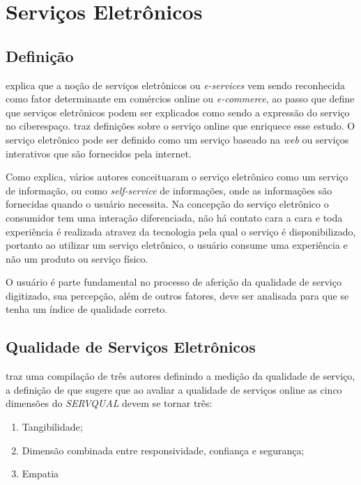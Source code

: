 \chapter[Serviços eletrônicos]{Serviços Eletrônicos}

\section{Definição}
\cite{santos2003} explica que a noção de serviços eletrônicos ou \textit{e-services} vem sendo reconhecida como fator determinante em comércios online ou \textit{e-commerce}, ao passo que \cite{rust2014} define que serviços eletrônicos podem ser explicados como sendo a expressão do serviço no ciberespaço.
\cite{rowley2006} traz definições sobre o serviço online que enriquece esse estudo. O serviço eletrônico pode ser definido como um serviço baseado na \textit{web} ou serviços interativos que são fornecidos pela internet. 

Como \cite{rowley2006} explica, vários autores conceituaram o serviço eletrônico como um serviço de informação, ou como \textit{self-service} de informações, onde as informações são fornecidas quando o usuário necessita. Na concepção do serviço eletrônico o consumidor tem uma interação diferenciada, não há contato cara a cara e toda experiência é realizada atravez da tecnologia pela qual o serviço é disponibilizado, portanto ao utilizar um serviço eletrônico, o usuário consume uma experiência e não um produto ou serviço físico. 

O usuário é parte fundamental no processo de aferição da qualidade de serviço digitizado, sua percepção, além de outros fatores, deve ser analisada para que se tenha um índice de qualidade correto.

\section{Qualidade de Serviços Eletrônicos}

\cite{buckley2003} traz uma compilação de três autores definindo a medição da qualidade de serviço, a definição de \cite{gefen2002} que sugere que ao avaliar a qualidade de serviços online as cinco dimensões do \textit{SERVQUAL} devem se tornar três: 
\begin{enumerate}
	\item Tangibilidade;
	\item Dimensão combinada entre responsividade, confiança e segurança;
	\item Empatia 
\end{enumerate}

